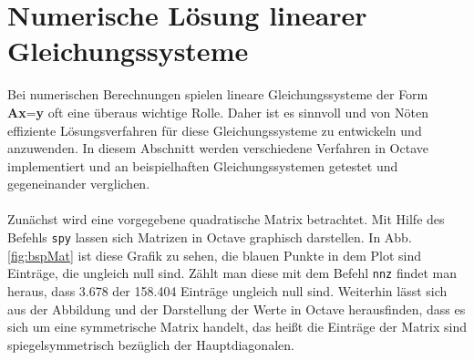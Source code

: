 \section{Numerische Lösung linearer Gleichungssysteme}
Bei numerischen Berechnungen spielen lineare Gleichungssysteme der Form \textbf{Ax}=\textbf{y} oft eine überaus wichtige Rolle. Daher ist es sinnvoll und von Nöten effiziente Lösungsverfahren für diese Gleichungssysteme zu entwickeln und anzuwenden. In diesem Abschnitt werden verschiedene Verfahren in Octave implementiert und an beispielhaften Gleichungssystemen getestet und gegeneinander verglichen.\\ \\
Zunächst wird eine vorgegebene quadratische Matrix betrachtet. Mit Hilfe des Befehls \texttt{spy} lassen sich Matrizen in Octave graphisch darstellen. In Abb. \ref{fig:bspMat} ist diese Grafik zu sehen, die blauen Punkte in dem Plot sind Einträge, die ungleich null sind. Zählt man diese mit dem Befehl \texttt{nnz} findet man heraus, dass 3.678 der 158.404 Einträge ungleich null sind. Weiterhin lässt sich aus der Abbildung und der Darstellung der Werte in Octave herausfinden, dass es sich um eine symmetrische Matrix handelt, das heißt die Einträge der Matrix sind spiegelsymmetrisch bezüglich der Hauptdiagonalen. \\ \\
